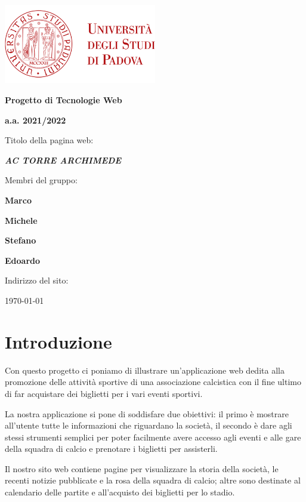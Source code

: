 \documentclass[12pt, a4paper]{article}
\begin{document}
\frenchspacing
\begin{titlepage}
	\centering
	\includegraphics[width=0.50\textwidth]{img/logo_unipd_color.png}\par\vspace{1cm} %
	
	{\LARGE\bfseries Progetto di Tecnologie Web \par}
	\vspace{1cm}
	
	{\Large\bfseries a.a. 2021/2022 \par}
	\vspace{1.5cm}
	
	{\Large Titolo della pagina web: \par}
	\vspace{0.5cm}
	
	{\LARGE\bfseries\itshape AC TORRE ARCHIMEDE \par}
	
	\vfill 

	Membri del gruppo: \par
	{\bfseries Marco \par}
	{\bfseries Michele \par}
	{\bfseries Stefano \par}
	{\bfseries Edoardo \par}
	
	\vfill

	Indirizzo del sito: \par
	\url{}
	\vfill
	
	{\large \today\par}
	
\end{titlepage}

\tableofcontents 
\pagebreak

\section{Introduzione}
Con questo progetto ci poniamo di illustrare un'applicazione web dedita alla promozione delle attività sportive di una associazione calcistica con il fine ultimo di far acquistare dei biglietti per i vari eventi sportivi.\par
La nostra applicazione si pone di soddisfare due obiettivi: il primo è mostrare all'utente tutte le informazioni che riguardano la società, il secondo è dare agli stessi strumenti semplici per poter facilmente avere accesso agli eventi e alle gare della squadra di calcio e prenotare i biglietti per assisterli.\par
Il nostro sito web contiene pagine per visualizzare la storia della società, le recenti notizie pubblicate e la rosa della squadra di calcio; altre sono destinate al calendario delle partite e all'acquisto dei biglietti per lo stadio.
\end{document}
